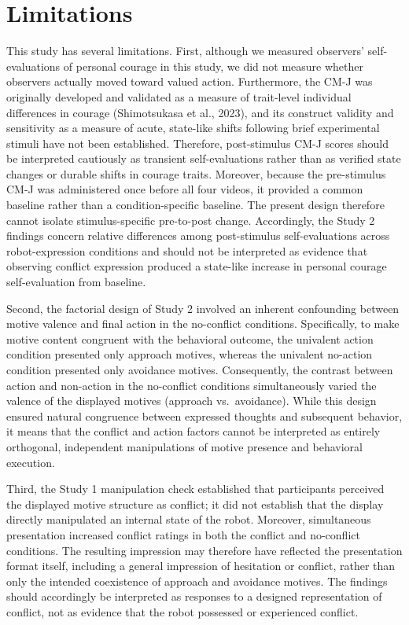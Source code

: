 \documentclass[utf8]{FrontiersinHarvard}
\begin{document}
\section{Limitations}\label{limitations}

This study has several limitations. First, although we measured observers' self-evaluations of personal courage in this study, we did not measure whether observers actually moved toward valued action. Furthermore, the CM-J was originally developed and validated as a measure of trait-level individual differences in courage (Shimotsukasa et al., 2023), and its construct validity and sensitivity as a measure of acute, state-like shifts following brief experimental stimuli have not been established. Therefore, post-stimulus CM-J scores should be interpreted cautiously as transient self-evaluations rather than as verified state changes or durable shifts in courage traits. Moreover, because the pre-stimulus CM-J was administered once before all four videos, it provided a common baseline rather than a condition-specific baseline. The present design therefore cannot isolate stimulus-specific pre-to-post change. Accordingly, the Study 2 findings concern relative differences among post-stimulus self-evaluations across robot-expression conditions and should not be interpreted as evidence that observing conflict expression produced a state-like increase in personal courage self-evaluation from baseline.

Second, the factorial design of Study 2 involved an inherent confounding between motive valence and final action in the no-conflict conditions. Specifically, to make motive content congruent with the behavioral outcome, the univalent action condition presented only approach motives, whereas the univalent no-action condition presented only avoidance motives. Consequently, the contrast between action and non-action in the no-conflict conditions simultaneously varied the valence of the displayed motives (approach vs.~avoidance). While this design ensured natural congruence between expressed thoughts and subsequent behavior, it means that the conflict and action factors cannot be interpreted as entirely orthogonal, independent manipulations of motive presence and behavioral execution.

Third, the Study 1 manipulation check established that participants perceived the displayed motive structure as conflict; it did not establish that the display directly manipulated an internal state of the robot. Moreover, simultaneous presentation increased conflict ratings in both the conflict and no-conflict conditions. The resulting impression may therefore have reflected the presentation format itself, including a general impression of hesitation or conflict, rather than only the intended coexistence of approach and avoidance motives. The findings should accordingly be interpreted as responses to a designed representation of conflict, not as evidence that the robot possessed or experienced conflict.
\end{document}
